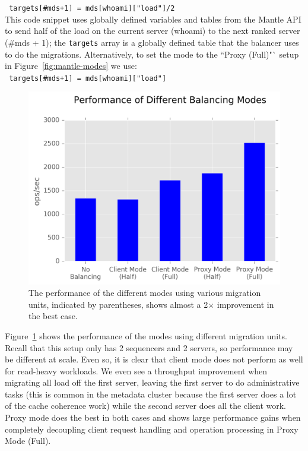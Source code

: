 \documentclass[preprint]{sigplanconf-eurosys}
\begin{document}
\noindent \texttt{ targets[\#mds+1] = mds[whoami]["load"]/2 }\\

This code snippet uses globally defined variables and tables from the Mantle
API to send half of the load on the current server (whoami) to the next ranked
server (\#mds + 1); the \texttt{targets} array is a globally defined table that
the balancer uses to do the migrations. Alternatively, to set the mode to the
``Proxy (Full)"` setup in Figure~\ref{fig:mantle-modes} we use:\\

\noindent \texttt{ targets[\#mds+1] = mds[whoami]["load"] }\\

\begin{figure}[t!]
\centering
\includegraphics{figures/mantle-mode-performance.png}
\caption{The performance of the different modes using various migration units,
indicated by parentheses, shows almost a 2\(\times\) improvement in the best
case.  }\label{fig:mantle-mode-performance}
\end{figure}

Figure~\ref{fig:mantle-mode-performance} shows the performance of the modes
using different migration units. Recall that this setup only has 2 sequencers
and 2 servers, so performance may be different at scale. Even so, it is clear
that client mode does not perform as well for read-heavy workloads. We
even see a throughput improvement when migrating all load off the first server,
leaving the first server to do administrative tasks (this is common in the
metadata cluster because the first server does a lot of the cache coherence
work) while the second server does all the client work. Proxy mode does the
best in both cases and shows large performance gains when completely decoupling
client request handling and operation processing in Proxy Mode (Full). 
\end{document}
